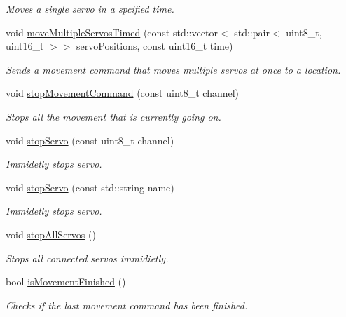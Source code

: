\begin{DoxyCompactItemize}
\begin{DoxyCompactList}\small\item\em Moves a single servo in a spcified time. \end{DoxyCompactList}\item 
void \hyperlink{class_motion_control_ab0693a90571a5e641cb7a7f8d43cee7a}{move\+Multiple\+Servos\+Timed} (const std\+::vector$<$ std\+::pair$<$ uint8\+\_\+t, uint16\+\_\+t $>$$>$ servo\+Positions, const uint16\+\_\+t time)
\begin{DoxyCompactList}\small\item\em Sends a movement command that moves multiple servo\textquotesingle{}s at once to a location. \end{DoxyCompactList}\item 
void \hyperlink{class_motion_control_aef8ec3f50c56b8981114c742486adae9}{stop\+Movement\+Command} (const uint8\+\_\+t channel)
\begin{DoxyCompactList}\small\item\em Stops all the movement that is currently going on. \end{DoxyCompactList}\item 
void \hyperlink{class_motion_control_a620288ede2a839574451dcfa5ff9c923}{stop\+Servo} (const uint8\+\_\+t channel)
\begin{DoxyCompactList}\small\item\em Immidetly stops servo. \end{DoxyCompactList}\item 
void \hyperlink{class_motion_control_af8136756f3c37e8d7850b3f320661e34}{stop\+Servo} (const std\+::string name)
\begin{DoxyCompactList}\small\item\em Immidetly stops servo. \end{DoxyCompactList}\item 
void \hyperlink{class_motion_control_ac45a88fcd3c1f1b238260ae8d1cb020f}{stop\+All\+Servos} ()
\begin{DoxyCompactList}\small\item\em Stops all connected servo\textquotesingle{}s immidietly. \end{DoxyCompactList}\item 
bool \hyperlink{class_motion_control_aee4432cb6495fb8c4ca87aede785a279}{is\+Movement\+Finished} ()
\begin{DoxyCompactList}\small\item\em Checks if the last movement command has been finished. \end{DoxyCompactList}\item 
$$
\end{DoxyCompactItemize}
